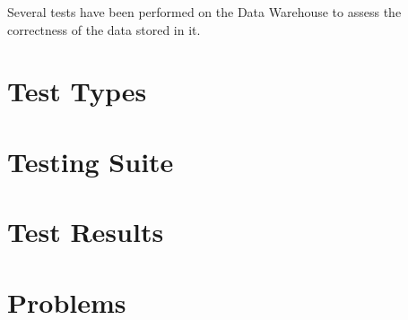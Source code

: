 \label{section:tests:data}
Several tests have been performed on the Data Warehouse to assess the correctness of the data stored in it.

\section{Test Types}
    
    
\section{Testing Suite}
    

\section{Test Results}
    
    
\section{Problems}
    





